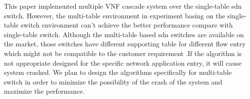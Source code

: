 \documentclass[10pt,journal]{IEEEtran}
\begin{document}
This paper implemented multiple VNF cascade system over the single-table sdn switch. However, the multi-table environment in experiment basing on the single-table switch environment can't achieve the better performance compare with single-table switch. Although the multi-table based sdn switches are available on the market, those switches have different supporting table for different flow entry which might not be compatible to the customer requirement .If the algorithm is not appropriate designed for the specific network application entry, it will cause system crashed. We plan to design the algorithms specifically for multi-table switch in order to minimize the possibility of the crash of the system and maximize the performance.



\end{document}
